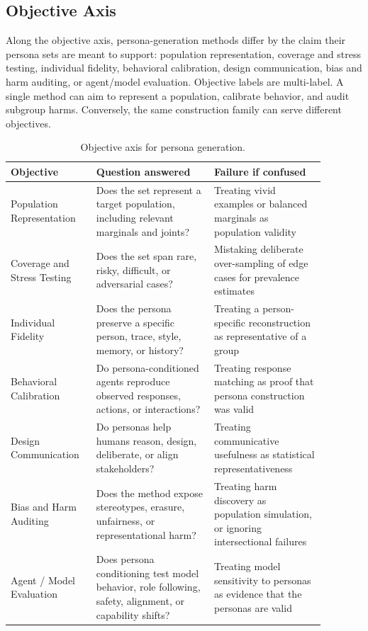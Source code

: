 \subsection{Objective Axis}

Along the objective axis, persona-generation methods differ by the claim their
persona sets are meant to support: population representation, coverage and
stress testing, individual fidelity, behavioral calibration, design
communication, bias and harm auditing, or agent/model evaluation. Objective
labels are multi-label. A single method can aim to represent a population,
calibrate behavior, and audit subgroup harms. Conversely, the same construction
family can serve different objectives.

\begin{table}[t]
\centering
\small
\begin{tabular}{p{0.22\linewidth}p{0.34\linewidth}p{0.32\linewidth}}
\toprule
\textbf{Objective} & \textbf{Question answered} & \textbf{Failure if confused} \\
\midrule
Population Representation &
Does the set represent a target population, including relevant marginals and joints? &
Treating vivid examples or balanced marginals as population validity \\
\addlinespace
Coverage and Stress Testing &
Does the set span rare, risky, difficult, or adversarial cases? &
Mistaking deliberate over-sampling of edge cases for prevalence estimates \\
\addlinespace
Individual Fidelity &
Does the persona preserve a specific person, trace, style, memory, or history? &
Treating a person-specific reconstruction as representative of a group \\
\addlinespace
Behavioral Calibration &
Do persona-conditioned agents reproduce observed responses, actions, or interactions? &
Treating response matching as proof that persona construction was valid \\
\addlinespace
Design Communication &
Do personas help humans reason, design, deliberate, or align stakeholders? &
Treating communicative usefulness as statistical representativeness \\
\addlinespace
Bias and Harm Auditing &
Does the method expose stereotypes, erasure, unfairness, or representational harm? &
Treating harm discovery as population simulation, or ignoring intersectional failures \\
\addlinespace
Agent / Model Evaluation &
Does persona conditioning test model behavior, role following, safety, alignment, or capability shifts? &
Treating model sensitivity to personas as evidence that the personas are valid \\
\bottomrule
\end{tabular}
\caption{Objective axis for persona generation.}
\label{tab:objective-axis}
\end{table}

